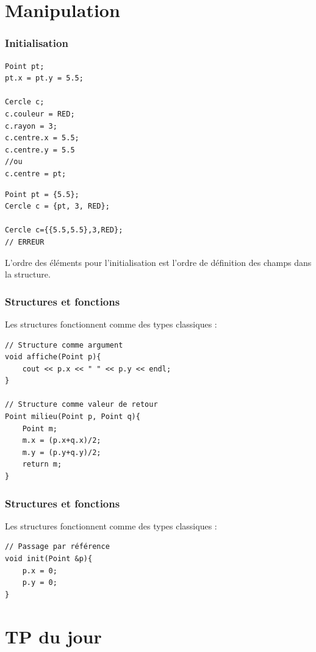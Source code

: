 \section{Manipulation}

\begin{frame}[fragile=singleslide]
	\frametitle{Initialisation}
	
	\begin{minipage}{0.49\linewidth}
		\begin{verbatim}
Point pt;
pt.x = pt.y = 5.5;

Cercle c;
c.couleur = RED;
c.rayon = 3;
c.centre.x = 5.5;
c.centre.y = 5.5
//ou
c.centre = pt;
		\end{verbatim}
	\end{minipage}
	\begin{minipage}{0.48\linewidth}
		\begin{verbatim}
Point pt = {5.5};
Cercle c = {pt, 3, RED};

Cercle c={{5.5,5.5},3,RED};
// ERREUR
		\end{verbatim}
	\end{minipage}
	L'ordre des éléments pour l'initialisation est l'ordre de définition des champs dans la structure.
\end{frame}

\begin{frame}[fragile=singleslide]
	\frametitle{Structures et fonctions}

	Les structures fonctionnent comme des types classiques :
	\begin{verbatim}
// Structure comme argument
void affiche(Point p){
    cout << p.x << " " << p.y << endl;
}

// Structure comme valeur de retour
Point milieu(Point p, Point q){
    Point m;
    m.x = (p.x+q.x)/2;
    m.y = (p.y+q.y)/2;
    return m;
}
	\end{verbatim}
\end{frame}

\begin{frame}[fragile=singleslide]
	\frametitle{Structures et fonctions}
	
	Les structures fonctionnent comme des types classiques :
		\begin{verbatim}
// Passage par référence
void init(Point &p){
    p.x = 0;
    p.y = 0;
}
		\end{verbatim}
\end{frame}

\section{TP du jour}

